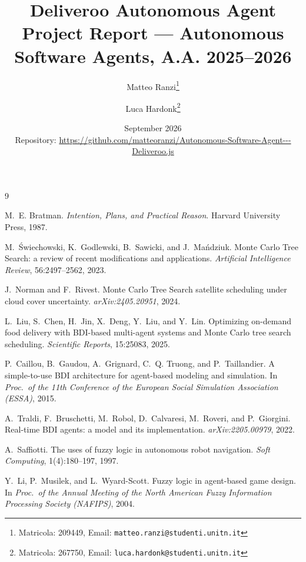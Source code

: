 \documentclass[10pt,a4paper]{article}
\title{\textbf{Deliveroo Autonomous Agent}\\[2pt]
\large Project Report --- Autonomous Software Agents, A.A. 2025--2026}
\author{
  Matteo Ranzi\thanks{Matricola: 209449, Email: \texttt{matteo.ranzi@studenti.unitn.it}}
  \and
  Luca Hardonk\thanks{Matricola: 267750, Email: \texttt{luca.hardonk@studenti.unitn.it}}
}
\date{September 2026\\[4pt]
\small Repository: \url{https://github.com/matteoranzi/Autonomous-Software-Agent---Deliveroo.js}}
\begin{document}
\maketitle












\begin{footnotesize}
\begin{thebibliography}{9}

M.~E. Bratman.
\newblock \emph{Intention, Plans, and Practical Reason}.
\newblock Harvard University Press, 1987.

M.~Świechowski, K.~Godlewski, B.~Sawicki, and J.~Mańdziuk.
\newblock Monte Carlo Tree Search: a review of recent modifications and applications.
\newblock \emph{Artificial Intelligence Review}, 56:2497--2562, 2023.

J.~Norman and F.~Rivest.
\newblock Monte Carlo Tree Search satellite scheduling under cloud cover uncertainty.
\newblock \emph{arXiv:2405.20951}, 2024.

L.~Liu, S.~Chen, H.~Jin, X.~Deng, Y.~Liu, and Y.~Lin.
\newblock Optimizing on-demand food delivery with BDI-based multi-agent systems and Monte Carlo
tree search scheduling.
\newblock \emph{Scientific Reports}, 15:25083, 2025.

P.~Caillou, B.~Gaudou, A.~Grignard, C.~Q. Truong, and P.~Taillandier.
\newblock A simple-to-use BDI architecture for agent-based modeling and simulation.
\newblock In \emph{Proc.\ of the 11th Conference of the European Social Simulation Association
(ESSA)}, 2015.

A.~Traldi, F.~Bruschetti, M.~Robol, D.~Calvaresi, M.~Roveri, and P.~Giorgini.
\newblock Real-time BDI agents: a model and its implementation.
\newblock \emph{arXiv:2205.00979}, 2022.

A.~Saffiotti.
\newblock The uses of fuzzy logic in autonomous robot navigation.
\newblock \emph{Soft Computing}, 1(4):180--197, 1997.

Y.~Li, P.~Musilek, and L.~Wyard-Scott.
\newblock Fuzzy logic in agent-based game design.
\newblock In \emph{Proc.\ of the Annual Meeting of the North American Fuzzy Information
Processing Society (NAFIPS)}, 2004.


\end{thebibliography}
\end{footnotesize}
\end{document}
